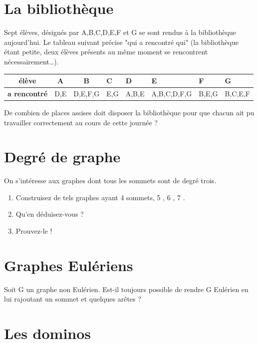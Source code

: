 \documentclass{article}[12pt]
\begin{document}
\newpage

\section*{La bibliothèque}

Sept élèves, désignés par A,B,C,D,E,F et G se sont rendus à la bibliothèque aujourd'hui. Le tableau suivant précise "qui a rencontré qui" (la bibliothèque étant petite, deux élèves présents au même moment se rencontrent nécessairement…). 

\begin{table}[h!]
\centering
\begin{tabular}{|c|c|c|l|l|l|l|l|}
\hline
\textbf{élève}       & \textbf{A} & \textbf{B} & \textbf{C} & \textbf{D} & \textbf{E}  & \textbf{F} & \textbf{G} \\ \hline
\textbf{a rencontré} & D,E        & D,E,F,G    & E,G        & A,B,E      & A,B,C,D,F,G & B,E,G      & B,C,E,F    \\ \hline
\end{tabular}
\end{table}

De combien de places assises doit disposer la bibliothèque pour que chacun ait pu travailler correctement au cours de cette journée ?

\section*{Degré de graphe}

On s’intéresse aux graphes dont tous les sommets sont de degré trois.
\begin{enumerate}
    \item Construisez de tels graphes ayant 4 sommets, 5 , 6 , 7 .
    \item Qu'en déduisez-vous ?
    \item Prouvez-le !
\end{enumerate}



\section*{Graphes Eulériens}

Soit G un graphe non Eulérien. Est-il toujours possible de rendre G Eulérien en lui rajoutant un sommet et quelques arêtes ?


\section*{Les dominos}
\end{document}
